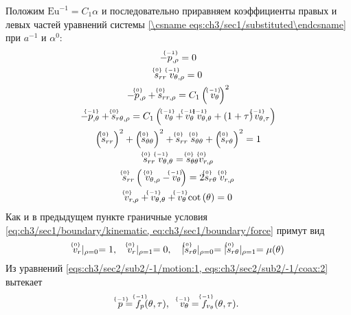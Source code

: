 Положим $\text{Eu}^{-1} = C_1 \alpha$ и последовательно приравняем коэффициенты правых и левых частей уравнений системы \cref{\csname eqs:ch3/sec1/substituted\endcsname} при $a^{-1}$ и $\alpha^0$:
\begin{gather}
  \label{eqs:ch3/sec2/sub2/-1/motion:1}
  -\uindex{p}{-1}_{,\rho} = 0
  \\
  \label{eqs:ch3/sec2/sub2/-1/coax:2}
  \uindex{s}{0}_{rr} \; \uindex{v}{-1}_{\theta,\rho} = 0
  \\
  \label{eqs:ch3/sec2/sub2/0/motion:1}
  -\uindex{p}{0}_{,\rho} + \uindex{s}{0}_{rr,\rho} = C_1 \left(\ \uindex{v}{-1}_{\theta}\right)^2
  \\
  \label{eqs:ch3/sec2/sub2/0/motion:2}
  -\uindex{p}{-1}_{,\theta} + \uindex{s}{0}_{r\theta,\rho} = C_1 \left(\ \uindex{v}{-1}_{\theta} + \uindex{v}{-1}_{\theta} \; \uindex{v}{-1}_{\theta,\theta} +
  \left(1+\tau\right) \uindex{v}{-1}_{\theta,\tau}\right)
  \\
  \label{eqs:ch3/sec2/sub2/0/plasticity}
  \left(\uindex{s}{0}_{rr}\right)^2 + \left(\uindex{s}{0}_{\theta\theta}\right)^2 + \uindex{s}{0}_{rr}\; \uindex{s}{0}_{\theta\theta} + \left(\uindex{s}{0}_{r\theta}\right)^2 = 1
  \\
  \label{eqs:ch3/sec2/sub2/0/coax:1}
  \uindex{s}{0}_{rr} \; \uindex{v}{-1}_{\theta,\theta} = \uindex{s}{0}_{\theta\theta} \uindex{v}{0}_{r,\rho}
  \\
  \label{eqs:ch3/sec2/sub2/0/coax:2}
  \uindex{s}{0}_{rr} \left(\ \uindex{v}{0}_{\theta,\rho} - \uindex{v}{-1}_{\theta}\right) = 2 \uindex{s}{0}_{r\theta} \; \uindex{v}{0}_{r,\rho}
  \\
  \label{eqs:ch3/sec2/sub2/0/uncompress}
  \uindex{v}{0}_{r,\rho} + \uindex{v}{-1}_{\theta,\theta} + \uindex{v}{-1}_{\theta} \cot{\left(\theta\right)} = 0
\end{gather}
Как и в предыдущем пункте граничные условия \cref{eq:ch3/sec1/boundary/kinematic, eq:ch3/sec1/boundary/force} примут вид
\begin{equation}
  \label{eq:ch3/sec2/sub2/boundary/0}
  \uindex{v}{0}_{r}\lvert_{\rho=0} = 1, \quad \uindex{v}{0}_{r}\lvert_{\rho=1} = 0, \quad \lvert \uindex{s}{0}_{r\theta}\lvert_{\rho=0} = \lvert \uindex{s}{0}_{r\theta}\lvert_{\rho=1} = \mu(\theta)
\end{equation}
Из уравнений \cref{eqs:ch3/sec2/sub2/-1/motion:1, eqs:ch3/sec2/sub2/-1/coax:2} вытекает
\begin{equation*}
  \uindex{p}{-1} = \uindex{f}{-1}_{p}(\theta, \tau), \quad \uindex{v}{-1}_{\theta} = \uindex{f}{-1}_{v_{\theta}}(\theta, \tau).
\end{equation*}
